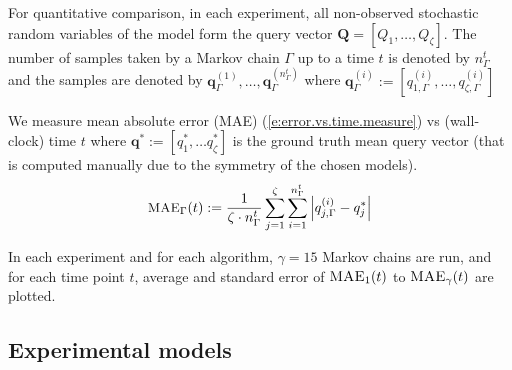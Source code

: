 \documentclass[letterpaper]{article}
\newcommand{\bvec}[1]{\textbf{#1}}
\begin{document}
For quantitative comparison,  
in each experiment, all non-observed stochastic random variables of the model  form the query vector $\bvec{Q} = [Q_1, \ldots, Q_\zeta]$.
The number of samples taken by a Markov chain $\Gamma$ up to a time $t$ is denoted by $n_{\Gamma}^t$ and  
the samples are denoted by 
$\bvec{q}_\Gamma^{(1)}, \ldots, \bvec{q}^{(n_{\Gamma}^t)}_\Gamma$
where $\bvec{q}_\Gamma^{(i)} := 
[q_{1, \Gamma}^{(i)} , \ldots, q_{\zeta, \Gamma}^{(i)}]$

We measure mean absolute error (MAE) (\ref{e:error.vs.time.measure}) vs (wall-clock) time $t$ where 
$\bvec{q}^* := [q_1^*, \ldots q_\zeta^*]$ 
is the ground truth mean query vector (that is computed manually due to the symmetry of the chosen models).
\begin{equation}\footnotesize
\label{e:error.vs.time.measure}
\textsc{MAE}_{\Gamma}(t) := \frac{1}{\zeta \cdot n_\Gamma^t} 
\sum_{j=1}^{\zeta}
\sum_{i=1}^{n_\Gamma^t}
\left|{q}^{(i)}_{j, \Gamma} - {q}_j^* \right|
\end{equation}


In each experiment and for each algorithm, $\gamma = 15$ Markov chains are run,  and for each time point $t$,
average and standard error of %
$\textsc{MAE}_{1}(t)$ to $\textsc{MAE}_{\gamma}(t)$
are plotted. 

\subsection{Experimental models}
\label{sect:experimental.results.models}
\end{document}
